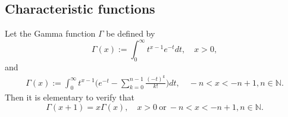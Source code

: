 \documentclass[12pt, a4paper]{amsart}
\theoremstyle{definition}
\numberwithin{equation}{section}
\begin{document}
\subsection{Characteristic functions}
    Let the Gamma function $\Gamma$ be defined by
\begin{equation}
    \Gamma (x) := \int_0^\infty t^{x-1} e^{-t}dt, 
    \quad x>0,
\end{equation}
and
\begin{align}
\label{eq: definition of Gamma function}
    \Gamma(x)
    := \int_0^\infty t^{x-1} \Big(e^{-t} - \sum_{k=0}^{n-1} \frac{(-t)^k}{k!}\Big) dt,
    \quad -n< x< -n+1, n\in \mathbb N.
\end{align}
    Then it is elementary to verify that
\begin{equation}
    \Gamma(x+1) = x\Gamma(x),
    \quad x>0~\text{or}~-n< x< -n+1, n\in \mathbb N.
\end{equation}
    
\end{document}
